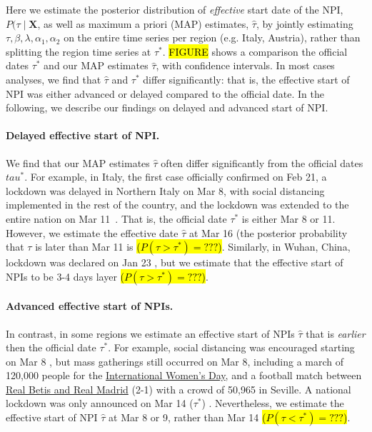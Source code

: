 \documentclass[12pt]{extarticle}
\let\vec\mathbf
\begin{document}
Here we estimate the posterior distribution of \emph{effective} start date of the NPI, $P(\tau \mid \vec{X}$, as well as maximum a priori (MAP) estimates, $\hat{\tau}$, by jointly estimating $\tau, \beta, \lambda, \alpha_1, \alpha_2$ on the entire time series per region (e.g. Italy, Austria), rather than splitting the region time series at $\tau^*$. 
\hl{FIGURE} shows a comparison the official dates $\tau^*$ and our MAP estimates $\hat{\tau}$, with confidence intervals. 
In most cases analyses, we find that $\hat{\tau}$ and $\tau^*$ differ significantly: that is, the effective start of NPI was either advanced or delayed compared to the official date.
In the following, we describe our findings on delayed and advanced start of NPI. 

\paragraph*{Delayed effective start of NPI.}
We find that our MAP estimates $\hat{\tau}$ often differ significantly from the official dates $tau^*$. 
For example, in Italy, the first case officially confirmed on Feb 21, a lockdown was delayed in Northern Italy on Mar 8, with social distancing implemented in the rest of the country, and the lockdown was extended to the entire nation on Mar 11~\citep{Gatto2020}.
That is, the official date $\tau^*$ is either Mar 8 or 11.
However, we estimate the effective date $\hat{\tau}$ at Mar 16 (the posterior probability that $\tau$ is later than Mar 11 is \hl{($P(\tau > \tau^*)=???$)}.
Similarly, in Wuhan, China, lockdown was declared on Jan 23 \citep{Li2020}, but we estimate that the effective start of NPIs to be 3-4 days layer \hl{($P(\tau > \tau^*)=???$)}.

\paragraph*{Advanced effective start of NPIs.}
In contrast, in some regions we estimate an effective start of NPIs $\hat{\tau}$ that is \emph{earlier} then the official date $\tau^*$.
For example, social distancing was encouraged starting on Mar 8 \citep{Flaxman2020}, but mass gatherings still occurred on Mar 8, including a march of 120,000 people for the \href{https://www.nytimes.com/2020/03/13/world/europe/spain-coronavirus-emergency.html}{International Women's Day}, and a  football match between \href{https://www.espn.com/soccer/match?gameId=550350}{Real Betis and Real Madrid} (2-1) with a crowd of 50,965 in Seville.
A national lockdown was only announced on Mar 14 ($\tau^*$) \citep{Flaxman2020}.
Nevertheless, we estimate the effective start of NPI $\hat{\tau}$ at Mar 8 or 9, rather than Mar 14 \hl{($P(\tau < \tau^*)=???$)}.
\end{document}
